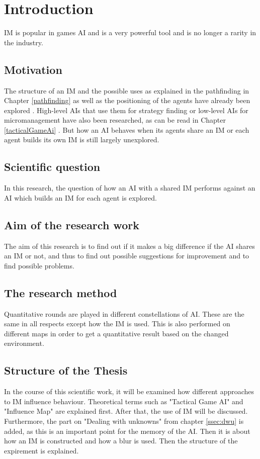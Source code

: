 \documentclass[]{report}
\begin{document}
	\newpage
	\tableofcontents

	\chapter{Introduction}
	\ac{IM} is popular in games \ac{AI} and is a very powerful tool and is no longer a rarity in the industry.
	
	\section{Motivation}
	The structure of an \ac{IM} and the possible uses as explained in the pathfinding in Chapter \ref{pathfinding} as well as the positioning of the agents have already been explored \citep{imPathfinding}. High-level \ac{AI}s that use them for strategy finding or low-level \ac{AI}s for micromanagement have also been researched, as can be read in Chapter \ref{tacticalGameAi} \citep{AIforGamesTactical} \citep{gameAIPro} \citep{gameDevInfluenceMap}. But how an \ac{AI} behaves when its agents share an \ac{IM} or each agent builds its own \ac{IM} is still largely unexplored.
	
	\section{Scientific question} \label{scientificquestion}
	In this research, the question of how an \ac{AI} with a shared IM performs against an \ac{AI} which builds an \ac{IM} for each agent is explored. 

	\section{Aim of the research work} \label{aimoftheresearchwork}
	The aim of this research is to find out if it makes a big difference if the \ac{AI} shares an \ac{IM} or not, and thus to find out possible suggestions for improvement and to find possible problems.
	
	\section{The research method}
	Quantitative rounds are played in different constellations of \ac{AI}. These are the same in all respects except how the \ac{IM} is used. This is also performed on different maps in order to get a quantitative result based on the changed environment. 

	\section{Structure of the Thesis}
	In the course of this scientific work, it will be examined how different approaches to \ac{IM} influence behaviour. Theoretical terms such as "Tactical Game AI" and "Influence Map" are explained first. After that, the use of \ac{IM} will be discussed. Furthermore, the part on "Dealing with unknowns" from chapter \ref{ssec:dwu} is added, as this is an important point for the memory of the \ac{AI}. Then it is about how an IM is constructed and how a blur is used. Then the structure of the expirement is explained. \\
	
\end{document}

